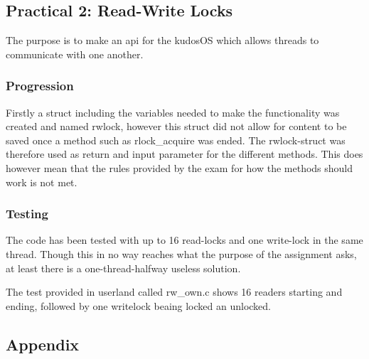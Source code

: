 \documentclass[11pt,a4paper]{article}
\theoremstyle{plain}
\theoremstyle{definition}
\theoremstyle{remark}
\numberwithin{equation}{section}
\begin{document}
\subsection*{Practical 2: Read-Write Locks}

The purpose is to make an api for the kudosOS which allows threads to communicate with one another.


\subsubsection*{Progression}

Firstly a struct including the variables needed to make the functionality was created and named rwlock, however this struct did not allow for content to be saved once a method such as rlock\_acquire was ended. The rwlock-struct was therefore used as return and input parameter for the different methods. This does however mean that the rules provided by the exam for how the methods should work is not met.


\subsubsection*{Testing}

The code has been tested with up to 16 read-locks and one write-lock in the same thread. Though this in no way reaches what the purpose of the assignment asks, at least there is a one-thread-halfway useless solution.

The test provided in userland called rw\_own.c shows 16 readers starting and ending, followed by one writelock beaing locked an unlocked.




\subsection*{Appendix}
\end{document}

